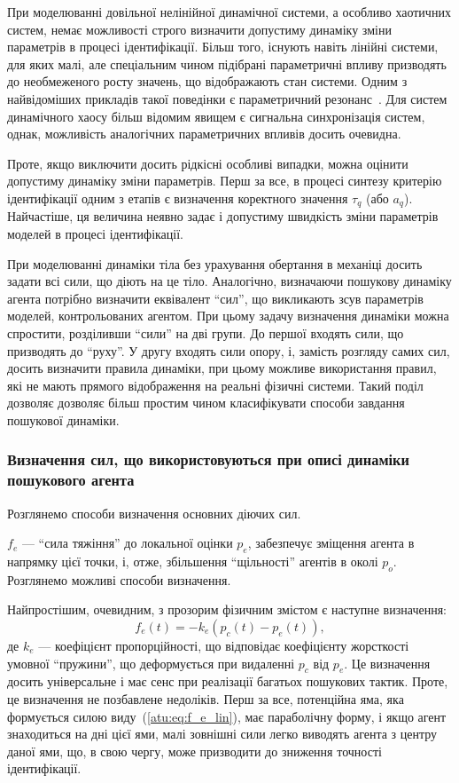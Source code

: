 При моделюванні довільної нелінійної динамічної системи,
а особливо хаотичних систем, немає можливості строго
визначити допустиму динаміку зміни параметрів в процесі
ідентифікації. Більш того, існують навіть лінійні системи, для
яких малі, але спеціальним чином підібрані параметричні впливу
призводять до необмеженого росту значень, що відображають
стан системи. Одним з найвідоміших прикладів такої поведінки є
параметричний резонанс~\cite{landau1}. Для систем динамічного хаосу
більш відомим явищем є сигнальна синхронізація систем, однак,
можливість аналогічних параметричних впливів досить очевидна.

Проте, якщо виключити досить рідкісні особливі випадки, можна
оцінити допустиму динаміку зміни параметрів. Перш за все,
в процесі синтезу критерію ідентифікації одним з етапів є
визначення коректного значення
$\tau_q$ (або $a_q$).
Найчастіше, ця величина неявно задає і допустиму
швидкість зміни параметрів моделей в процесі ідентифікації.

При моделюванні динаміки тіла без урахування обертання в механіці досить задати
всі сили, що діють на це тіло. Аналогічно, визначаючи пошукову динаміку агента
потрібно визначити еквівалент ``сил'', що викликають зсув параметрів моделей,
контрольованих агентом. При цьому задачу визначення динаміки можна спростити,
розділивши ``сили'' на дві групи. До першої входять сили, що призводять до ``руху''.
У другу входять сили опору, і, замість розгляду самих сил, досить
визначити правила динаміки, при цьому можливе використання правил, які не мають
прямого відображення на реальні фізичні системи.
Такий поділ дозволяє дозволяє більш простим чином класифікувати
способи завдання пошукової динаміки.


\subsubsection{Визначення сил, що використовуються при описі динаміки пошукового агента} %

Розглянемо способи визначення основних діючих сил.

$f_e$ ---
``сила тяжіння'' до локальної оцінки $p_e$, забезпечує зміщення
агента в напрямку цієї точки, і, отже, збільшення ``щільності'' агентів в
околі $p_o$.
Розглянемо можливі способи визначення.

Найпростішим, очевидним, з прозорим фізичним змістом є
наступне визначення:
%
\begin{equation}
  f_e(t) = - k_e \left( p_c(t) - p_e(t) \right)  ,
  \label{atu:eq:f_e_lin}
\end{equation}
%
де $k_e$ --- коефіцієнт пропорційності, що відповідає коефіцієнту жорсткості
умовної ``пружини'', що деформується при видаленні $p_c$ від $p_e$. Це
визначення досить універсальне і має сенс при реалізації багатьох пошукових
тактик.
%
Проте, це визначення не позбавлене недоліків. Перш за все,
потенційна яма, яка формується силою виду~(\ref{atu:eq:f_e_lin}), має параболічну
форму, і якщо агент знаходиться на дні цієї ями, малі зовнішні
сили легко виводять агента з центру даної ями, що, в свою чергу,
може призводити до зниження точності ідентифікації.

